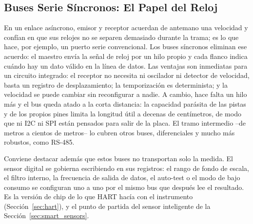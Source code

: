 \subsection{Buses Serie Síncronos: El Papel del Reloj}\label{sub:bus_sincrono}

En un enlace asíncrono, emisor y receptor acuerdan de antemano una velocidad y confían en que sus relojes no se separen demasiado durante la trama; es lo que hace, por ejemplo, un puerto serie convencional. Los buses síncronos eliminan ese acuerdo: el maestro envía la señal de reloj por un hilo propio y cada flanco indica cuándo hay un dato válido en la línea de datos. Las ventajas son inmediatas para un circuito integrado: el receptor no necesita ni oscilador ni detector de velocidad, basta un registro de desplazamiento; la temporización es determinista; y la velocidad se puede cambiar sin reconfigurar a nadie. A cambio, hace falta un hilo más y el bus queda atado a la corta distancia: la capacidad parásita de las pistas y de los propios pines limita la longitud útil a decenas de centímetros, de modo que ni I2C ni SPI están pensados para salir de la placa. El tramo intermedio --de metros a cientos de metros-- lo cubren otros buses, diferenciales y mucho más robustos, como RS-485.

Conviene destacar además que estos buses no transportan solo la medida. El sensor digital se gobierna escribiendo en sus registros: el rango de fondo de escala, el filtro interno, la frecuencia de salida de datos, el auto-test o el modo de bajo consumo se configuran uno a uno por el mismo bus que después lee el resultado. Es la versión de chip de lo que HART hacía con el instrumento (Sección~\ref{sec:hart}), y el punto de partida del sensor inteligente de la Sección~\ref{sec:smart_sensors}.

